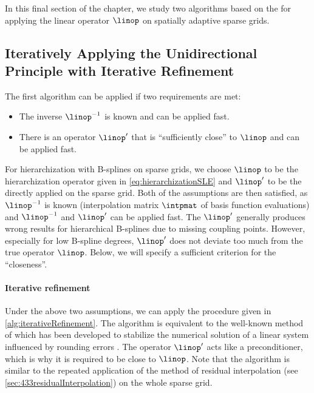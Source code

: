 \label{sec:45spatAdaptiveUP}

In this final section of the chapter,
we study two algorithms based on the \up
for applying the linear operator $\linop$ on spatially adaptive sparse grids.



\subsection{%
  Iteratively Applying the Unidirectional Principle with Iterative Refinement%
}
\label{sec:451iterativeRefinement}

The first algorithm can be applied if two requirements are met:
\begin{itemize}
  \item
  The inverse $\linop^{-1}$ is known and can be applied fast.
  
  \item
  There is an operator $\linop'$
  that is ``sufficiently close'' to $\linop$ and can be applied fast.
\end{itemize}
For hierarchization with B-splines on sparse grids,
we choose $\linop$ to be the hierarchization
operator given in \cref{eq:hierarchizationSLE} and
$\linop'$ to be the \up directly applied on the
sparse grid.
Both of the assumptions are then satisfied,
as $\linop^{-1}$ is known
(interpolation matrix $\intpmat$ of basis function evaluations)
and $\linop^{-1}$ and $\linop'$ can be applied fast.
The \up $\linop'$ generally produces wrong
results for hierarchical B-splines due to missing coupling points.
However, especially for low B-spline degrees,
$\linop'$ does not deviate too much from the true operator $\linop$.
Below, we will specify a sufficient criterion for the ``closeness''.

\paragraph{Iterative refinement}

Under the above two assumptions, we can apply the procedure given in
\cref{alg:iterativeRefinement}.
The algorithm is equivalent to the well-known method of
 which has been developed to
stabilize the numerical solution of a linear system
influenced by rounding errors \cite{Higham02Accuracy}.
The operator $\linop'$ acts like a preconditioner,
which is why it is required to be close to $\linop$.
Note that the algorithm is similar to the repeated application
of the method of residual interpolation
(see \cref{sec:433residualInterpolation}) on the whole sparse grid.

